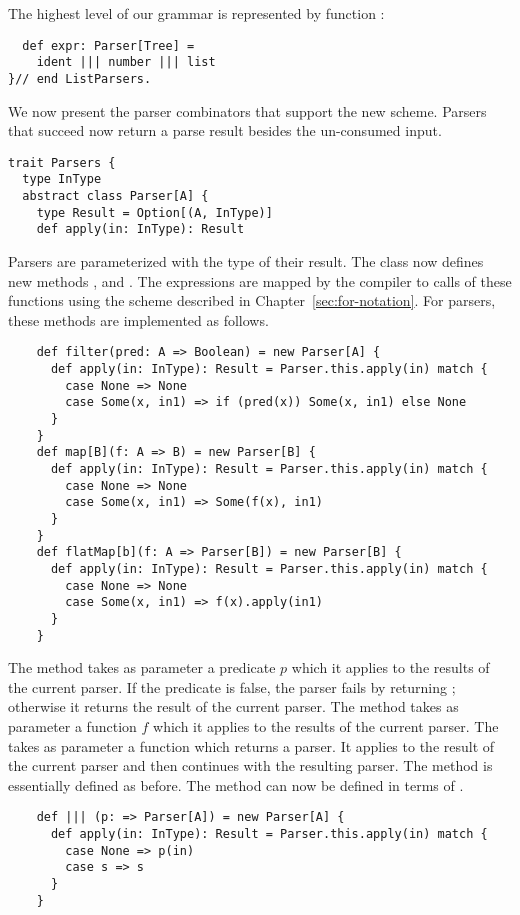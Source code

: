 {The highest level of our grammar is represented by function
:
\begin{lstlisting}
  def expr: Parser[Tree] = 
    ident ||| number ||| list
}// end ListParsers.
\end{lstlisting}
We now present the parser combinators that support the new
scheme. Parsers that succeed now return a parse result besides the
un-consumed input.
\begin{lstlisting}
trait Parsers {
  type InType
  abstract class Parser[A] {
    type Result = Option[(A, InType)]
    def apply(in: InType): Result
\end{lstlisting}
Parsers are parameterized with the type of their result. The class
 now defines new methods , 
and . The  expressions are mapped by the
compiler to calls of these functions using the scheme described in
Chapter~\ref{sec:for-notation}. For parsers, these methods are
implemented as follows.
\begin{lstlisting}
    def filter(pred: A => Boolean) = new Parser[A] {
      def apply(in: InType): Result = Parser.this.apply(in) match {
        case None => None
        case Some(x, in1) => if (pred(x)) Some(x, in1) else None
      }
    }
    def map[B](f: A => B) = new Parser[B] {
      def apply(in: InType): Result = Parser.this.apply(in) match {
        case None => None
        case Some(x, in1) => Some(f(x), in1)
      }
    }
    def flatMap[b](f: A => Parser[B]) = new Parser[B] {
      def apply(in: InType): Result = Parser.this.apply(in) match {
        case None => None
        case Some(x, in1) => f(x).apply(in1)
      }
    }
\end{lstlisting}
The  method takes as parameter a predicate $p$ which it
applies to the results of the current parser. If the predicate is
false, the parser fails by returning ; otherwise it returns
the result of the current parser.  The  method takes as
parameter a function $f$ which it applies to the results of the
current parser. The  takes as parameter a function
 which returns a parser.  It applies  to the result of
the current parser and then continues with the resulting parser.  The
\code{|||} method is essentially defined as before.  The
\code{&&&} method can now be defined in terms of .
\begin{lstlisting}
    def ||| (p: => Parser[A]) = new Parser[A] {
      def apply(in: InType): Result = Parser.this.apply(in) match {
        case None => p(in)
        case s => s
      }
    }


\end{lstlisting}}
